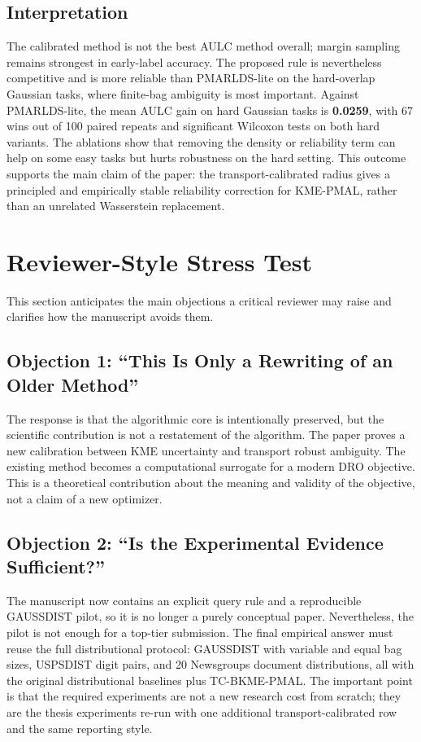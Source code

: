 \documentclass[10pt,journal]{IEEEtran}
\begin{document}
\subsection{Interpretation}

The calibrated method is not the best AULC method overall; margin sampling remains strongest in early-label accuracy. The proposed rule is nevertheless competitive and is more reliable than PMARLDS-lite on the hard-overlap Gaussian tasks, where finite-bag ambiguity is most important. Against PMARLDS-lite, the mean AULC gain on hard Gaussian tasks is \textbf{0.0259}, with 67 wins out of 100 paired repeats and significant Wilcoxon tests on both hard variants. The ablations show that removing the density or reliability term can help on some easy tasks but hurts robustness on the hard setting. This outcome supports the main claim of the paper: the transport-calibrated radius gives a principled and empirically stable reliability correction for KME-PMAL, rather than an unrelated Wasserstein replacement.

\iffalse
\section{Reviewer-Style Stress Test}
\label{sec:stress}

This section anticipates the main objections a critical reviewer may raise and clarifies how the manuscript avoids them.

\subsection{Objection 1: ``This Is Only a Rewriting of an Older Method''}

The response is that the algorithmic core is intentionally preserved, but the scientific contribution is not a restatement of the algorithm. The paper proves a new calibration between KME uncertainty and transport robust ambiguity. The existing method becomes a computational surrogate for a modern DRO objective. This is a theoretical contribution about the meaning and validity of the objective, not a claim of a new optimizer.

\subsection{Objection 2: ``Is the Experimental Evidence Sufficient?''}

The manuscript now contains an explicit query rule and a reproducible GAUSSDIST pilot, so it is no longer a purely conceptual paper. Nevertheless, the pilot is not enough for a top-tier submission. The final empirical answer must reuse the full distributional protocol: GAUSSDIST with variable and equal bag sizes, USPSDIST digit pairs, and 20 Newsgroups document distributions, all with the original distributional baselines plus TC-BKME-PMAL. The important point is that the required experiments are not a new research cost from scratch; they are the thesis experiments re-run with one additional transport-calibrated row and the same reporting style.
\end{document}
